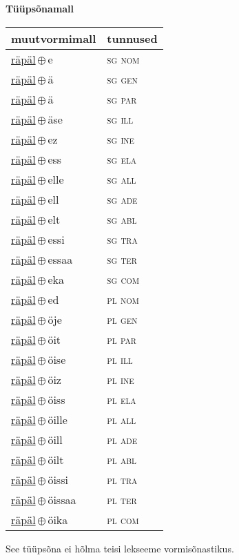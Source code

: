 

\vspace{3.5em}
\noindent \begin{minipage}{\textwidth}
\noindent \textbf{Tüüpsõnamall \,}\\

\begin{sideways}
\begin{tabular}{l l}
muutvormimall & tunnused \\
\hline
\underline{räpäl}\,$\oplus$\,e & \textsc{ sg nom } \\
\underline{räpäl}\,$\oplus$\,ä & \textsc{ sg gen } \\
\underline{räpäl}\,$\oplus$\,ä & \textsc{ sg par } \\
\underline{räpäl}\,$\oplus$\,äse & \textsc{ sg ill } \\
\underline{räpäl}\,$\oplus$\,ez & \textsc{ sg ine } \\
\underline{räpäl}\,$\oplus$\,ess & \textsc{ sg ela } \\
\underline{räpäl}\,$\oplus$\,elle & \textsc{ sg all } \\
\underline{räpäl}\,$\oplus$\,ell & \textsc{ sg ade } \\
\underline{räpäl}\,$\oplus$\,elt & \textsc{ sg abl } \\
\underline{räpäl}\,$\oplus$\,essi & \textsc{ sg tra } \\
\underline{räpäl}\,$\oplus$\,essaa & \textsc{ sg ter } \\
\underline{räpäl}\,$\oplus$\,eka & \textsc{ sg com } \\
\underline{räpäl}\,$\oplus$\,ed & \textsc{ pl nom } \\
\underline{räpäl}\,$\oplus$\,öje & \textsc{ pl gen } \\
\underline{räpäl}\,$\oplus$\,öit & \textsc{ pl par } \\
\underline{räpäl}\,$\oplus$\,öise & \textsc{ pl ill } \\
\underline{räpäl}\,$\oplus$\,öiz & \textsc{ pl ine } \\
\underline{räpäl}\,$\oplus$\,öiss & \textsc{ pl ela } \\
\underline{räpäl}\,$\oplus$\,öille & \textsc{ pl all } \\
\underline{räpäl}\,$\oplus$\,öill & \textsc{ pl ade } \\
\underline{räpäl}\,$\oplus$\,öilt & \textsc{ pl abl } \\
\underline{räpäl}\,$\oplus$\,öissi & \textsc{ pl tra } \\
\underline{räpäl}\,$\oplus$\,öissaa & \textsc{ pl ter } \\
\underline{räpäl}\,$\oplus$\,öika & \textsc{ pl com } \\
\end{tabular}
\end{sideways}
\label{tab:tüüpsõnamall-räpäle}

\end{minipage}

 
\vspace{1em}
\noindent See tüüpsõna ei hõlma teisi lekseeme vormi\-sõnastikus.
